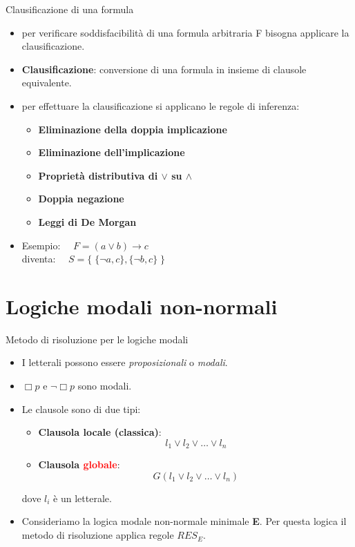 \documentclass{beamer}
\begin{document}
\begin{frame}{Clausificazione di una formula}
    \begin{itemize}
        \item per verificare soddisfacibilità di una formula arbitraria F bisogna applicare la clausificazione.
        \item \textbf{Clausificazione}: conversione di una formula in insieme di clausole equivalente.
        \item per effettuare la clausificazione si applicano le regole di inferenza:
        \begin{itemize}
            \item \textbf{Eliminazione della doppia implicazione}
            \item \textbf{Eliminazione dell'implicazione}
            \item \textbf{Proprietà distributiva di $\lor$ su $\land$}
            \item \textbf{Doppia negazione}
            \item \textbf{Leggi di De Morgan}
        \end{itemize}
        \item Esempio: $\quad F = (a \lor b) \to c$ \\diventa: $\quad S = \{ \; \{\lnot a, c\}, \{\lnot b, c\} \; \}$
    \end{itemize}
    
\end{frame}

\section{Logiche modali non-normali}
\begin{frame}{Metodo di risoluzione per le logiche modali}
    \begin{itemize}
        \item I letterali possono essere \emph{proposizionali} o \emph{modali}. 
        \item $\Box p$ e $\lnot \Box p$ sono modali.
        \item Le clausole sono di due tipi:
        \begin{itemize}
            \item \textbf{Clausola locale (classica)}: \[ l_1 \lor l_2 \lor \ldots \lor l_n \]
            \item \textbf{Clausola \textcolor{red}{globale}}: \[ G(l_1 \lor l_2 \lor \ldots \lor l_n) \]
        \end{itemize}
        dove $l_i$ è un letterale.
        \item Consideriamo la logica modale non-normale minimale \textbf{E}. Per questa logica il metodo di risoluzione applica regole $RES_E$. 
    \end{itemize}

\end{frame}
\end{document}
